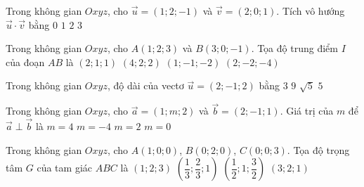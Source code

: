 
\begin{ex}
  Trong không gian $Oxyz$, cho $\vec u=(1;2;-1)$ và $\vec v=(2;0;1)$. Tích vô hướng $\vec u\cdot\vec v$ bằng
  \choice
    {$0$}
    {\True $1$}
    {$2$}
    {$3$}
\end{ex}

\begin{ex}
  Trong không gian $Oxyz$, cho $A(1;2;3)$ và $B(3;0;-1)$. Tọa độ trung điểm $I$ của đoạn $AB$ là
  \choice
    {\True $(2;1;1)$}
    {$(4;2;2)$}
    {$(1;-1;-2)$}
    {$(2;-2;-4)$}
\end{ex}

\begin{ex}%
  Trong không gian $Oxyz$, độ dài của vectơ $\vec u=(2;-1;2)$ bằng
  \choice
    {\True $3$}
    {$9$}
    {$\sqrt5$}
    {$5$}
\end{ex}

\begin{ex}
  Trong không gian $Oxyz$, cho $\vec a=(1;m;2)$ và $\vec b=(2;-1;1)$. Giá trị của $m$ để $\vec a\perp\vec b$ là
  \choice
    {\True $m=4$}
    {$m=-4$}
    {$m=2$}
    {$m=0$}
\end{ex}

\begin{ex}
  Trong không gian $Oxyz$, cho $A(1;0;0)$, $B(0;2;0)$, $C(0;0;3)$. Tọa độ trọng tâm $G$ của tam giác $ABC$ là
  \choice
    {$(1;2;3)$}
    {\True $\left(\dfrac13;\dfrac23;1\right)$}
    {$\left(\dfrac12;1;\dfrac32\right)$}
    {$(3;2;1)$}
\end{ex}

